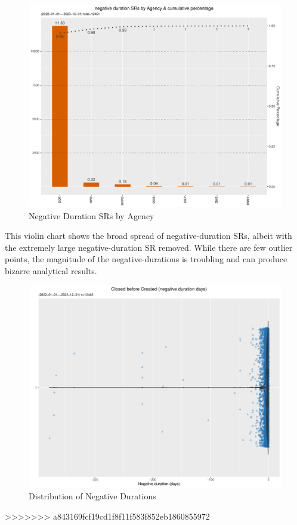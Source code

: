\documentclass[12pt, titlepage]{article}
\begin{document}
\begin{figure}[tbp]
 	 \centering
 	 \includegraphics[width = \textwidth]{negative_duration_SR_barchart.pdf}
	  \caption{Negative Duration SRs by Agency}
	  \label{fig:negative-duration}
\end{figure}

This violin chart shows the broad spread of negative-duration SRs, albeit with 
the extremely large negative-duration SR removed. While there are few 
outlier points, the magnitude of the negative-durations is troubling and can 
produce bizarre analytical results.

\begin{figure}[tbp]
 	 \centering
 	 \includegraphics[width = \textwidth]{negative_duration_SR_violin.pdf}
	 \caption{Distribution of Negative Durations}
	 \label{fig:negative-duration-violin}
\end{figure}
>>>>>>> a843169fcf19cd1f8f11f583f852eb1860855972
\end{document}
